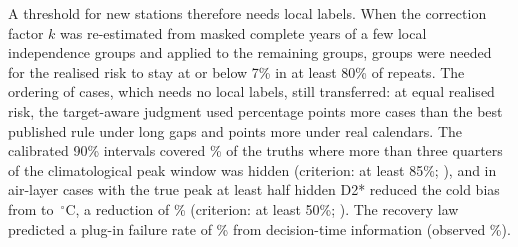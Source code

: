 A threshold for new stations therefore needs local labels. When the correction factor $k$ was re-estimated from masked complete years of a few local independence groups and applied to the remaining groups, \TNewLocalGroups{} groups were needed for the realised risk to stay at or below 7\% in at least 80\% of repeats. The ordering of cases, which needs no local labels, still transferred: at equal realised risk, the target-aware judgment used \TNewGainMech{} percentage points more cases than the best published rule under long gaps and \TNewGainDeploy{} points more under real calendars. The calibrated 90\% intervals covered \TNewHardCoverage\% of the truths where more than three quarters of the climatological peak window was hidden (criterion: at least 85\%; \TNewHardCoverageVerdict), and in air-layer cases with the true peak at least half hidden D2* reduced the cold bias from \TNewPOneBiasPZero{} to \TNewPOneBiasDTwo\,$^{\circ}$C, a reduction of \TNewPOneReduction\% (criterion: at least 50\%; \TNewPOneVerdict). The recovery law predicted a plug-in failure rate of \TNewLawPredicted\% from decision-time information (observed \TNewObservedFail\%).
